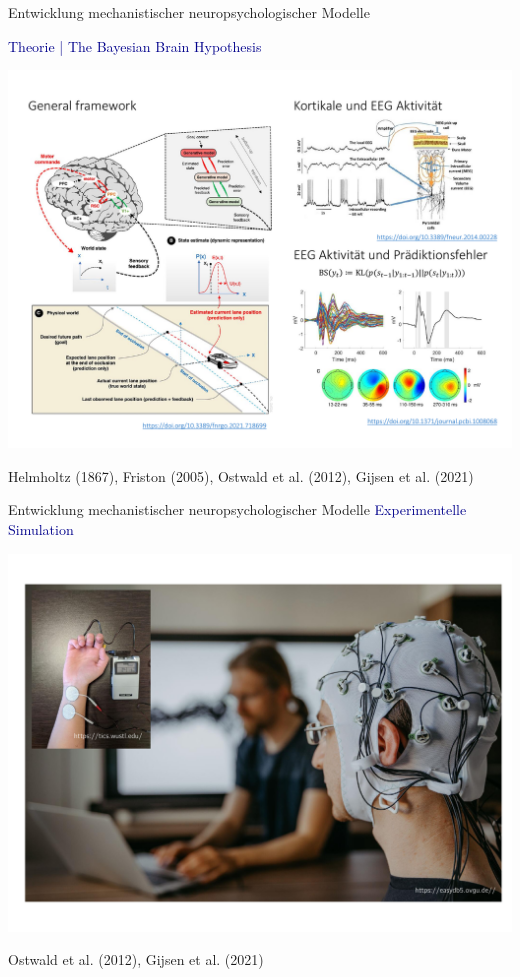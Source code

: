 \documentclass[
  8pt,
  ignorenonframetext,
]{beamer}
\begin{document}
\begin{frame}{Entwicklung mechanistischer neuropsychologischer Modelle}
\protect\hypertarget{entwicklung-mechanistischer-neuropsychologischer-modelle-1}{}
\vspace{2mm}

\textcolor{darkblue}{Theorie | The Bayesian Brain Hypothesis}
\vspace{-2mm}

\begin{center}\includegraphics[width=0.9\linewidth]{2_Abbildungen/pfm_2_bayesian_brain_hypothesis} \end{center}
\vspace{-3mm}
\flushright
\footnotesize

Helmholtz (1867), Friston (2005), Ostwald et al. (2012), Gijsen et al.
(2021)
\end{frame}

\begin{frame}{Entwicklung mechanistischer neuropsychologischer Modelle}
\protect\hypertarget{entwicklung-mechanistischer-neuropsychologischer-modelle-2}{}
\textcolor{darkblue}{Experimentelle Simulation} \vfill

\begin{center}\includegraphics[width=0.7\linewidth]{2_Abbildungen/pfm_2_somatosensation_eeg} \end{center}
\vfill

\flushright
\footnotesize

Ostwald et al. (2012), Gijsen et al. (2021)
\end{frame}
\end{document}
